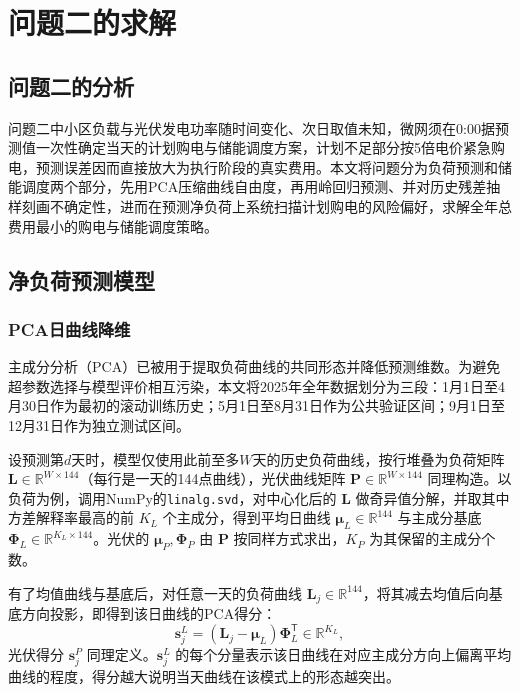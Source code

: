 \section{问题二的求解}

\subsection{问题二的分析}
问题二中小区负载与光伏发电功率随时间变化、次日取值未知，微网须在0:00据预测值一次性确定当天的计划购电与储能调度方案，计划不足部分按5倍电价紧急购电，预测误差因而直接放大为执行阶段的真实费用。本文将问题分为负荷预测和储能调度两个部分，先用PCA压缩曲线自由度，再用岭回归预测、并对历史残差抽样刻画不确定性，进而在预测净负荷上系统扫描计划购电的风险偏好，求解全年总费用最小的购电与储能调度策略。

\subsection{净负荷预测模型}

\subsubsection{PCA日曲线降维}
主成分分析（PCA）已被用于提取负荷曲线的共同形态并降低预测维数\cite{ref_pca_load}。为避免超参数选择与模型评价相互污染，本文将2025年全年数据划分为三段：1月1日至4月30日作为最初的滚动训练历史；5月1日至8月31日作为公共验证区间；9月1日至12月31日作为独立测试区间。

设预测第$d$天时，模型仅使用此前至多$W$天的历史负荷曲线，按行堆叠为负荷矩阵 $\mathbf{L}\in\mathbb{R}^{W\times144}$（每行是一天的144点曲线），光伏曲线矩阵 $\mathbf{P}\in\mathbb{R}^{W\times144}$ 同理构造。以负荷为例，调用NumPy的\texttt{linalg.svd}，对中心化后的 $\mathbf L$ 做奇异值分解，并取其中方差解释率最高的前 $K_L$ 个主成分，得到平均日曲线 $\bm\mu_L\in\mathbb{R}^{144}$ 与主成分基底 $\bm\Phi_L\in\mathbb{R}^{K_L\times144}$。光伏的 $\bm\mu_P,\bm\Phi_P$ 由 $\mathbf P$ 按同样方式求出，$K_P$ 为其保留的主成分个数。

有了均值曲线与基底后，对任意一天的负荷曲线 $\bm L_j\in\mathbb{R}^{144}$，将其减去均值后向基底方向投影，即得到该日曲线的PCA得分：
\begin{equation}
\bm s_j^L=(\bm L_j-\bm\mu_L)\bm\Phi_L^{\mathsf T}\in\mathbb{R}^{K_L},
\end{equation}
光伏得分 $\bm s_j^P$ 同理定义。$\bm s_j^L$ 的每个分量表示该日曲线在对应主成分方向上偏离平均曲线的程度，得分越大说明当天曲线在该模式上的形态越突出。

